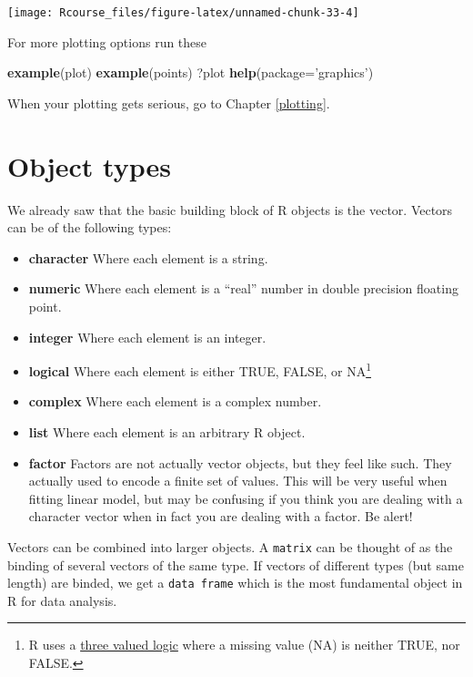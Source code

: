 \documentclass[]{book}
\newenvironment{Shaded}{\begin{snugshade}}{\end{snugshade}}
\newcommand{\KeywordTok}[1]{\textcolor[rgb]{0.13,0.29,0.53}{\textbf{{#1}}}}
\newcommand{\DataTypeTok}[1]{\textcolor[rgb]{0.13,0.29,0.53}{{#1}}}
\newcommand{\StringTok}[1]{\textcolor[rgb]{0.31,0.60,0.02}{{#1}}}
\newcommand{\NormalTok}[1]{{#1}}
\providecommand{\tightlist}{%
  \setlength{\itemsep}{0pt}\setlength{\parskip}{0pt}}
\theoremstyle{definition}
\theoremstyle{definition}
\theoremstyle{remark}
\begin{document}
\texttt{[image: Rcourse\_files/figure-latex/unnamed-chunk-33-4]}

For more plotting options run these

\begin{Shaded}
\begin{Highlighting}[]
\KeywordTok{example}\NormalTok{(plot)}
\KeywordTok{example}\NormalTok{(points)}
\NormalTok{?plot}
\KeywordTok{help}\NormalTok{(}\DataTypeTok{package=}\StringTok{'graphics'}\NormalTok{)}
\end{Highlighting}
\end{Shaded}

When your plotting gets serious, go to Chapter \ref{plotting}.

\section{Object types}\label{object-types}

We already saw that the basic building block of R objects is the vector.
Vectors can be of the following types:

\begin{itemize}
\tightlist
\item
  \textbf{character} Where each element is a string.
\item
  \textbf{numeric} Where each element is a ``real'' number in double
  precision floating point.
\item
  \textbf{integer} Where each element is an integer.
\item
  \textbf{logical} Where each element is either TRUE, FALSE, or
  NA\footnote{R uses a
    \href{https://en.wikipedia.org/wiki/Three-valued_logic}{three valued
    logic} where a missing value (NA) is neither TRUE, nor FALSE.}
\item
  \textbf{complex} Where each element is a complex number.
\item
  \textbf{list} Where each element is an arbitrary R object.
\item
  \textbf{factor} Factors are not actually vector objects, but they feel
  like such. They actually used to encode a finite set of values. This
  will be very useful when fitting linear model, but may be confusing if
  you think you are dealing with a character vector when in fact you are
  dealing with a factor. Be alert!
\end{itemize}

Vectors can be combined into larger objects. A \texttt{matrix} can be
thought of as the binding of several vectors of the same type. If
vectors of different types (but same length) are binded, we get a
\texttt{data\ frame} which is the most fundamental object in R for data
analysis.
\end{document}

